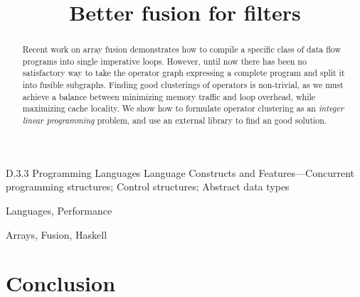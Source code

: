 \documentclass[preprint]{sigplanconf}
\begin{document}
\title{Better fusion for filters}


\maketitle
\makeatactive

\begin{abstract}
Recent work on array fusion demonstrates how to compile a specific class of data flow programs into single imperative loops. However, until now there has been no satisfactory way to take the operator graph expressing a complete program and split it into fusible subgraphs. Finding good clusterings of operators is non-trivial, as we must achieve a balance between minimizing memory traffic and loop overhead, while maximizing cache locality. We show how to formulate operator clustering as an \emph{integer linear programming} problem, and use an external library to find an good solution. 
\end{abstract}



\category
	{D.3.3}
	{Programming Languages}
	{Language Constructs and Features---Concurrent programming structures; Control structures; Abstract data types}

\terms
	Languages, Performance

\keywords
	Arrays, Fusion, Haskell







\section{Conclusion}



\end{document}
